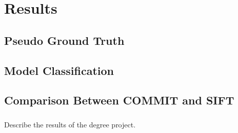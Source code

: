 \chapter{Results}

\section{Pseudo Ground Truth}

\section{Model Classification}

\section{Comparison Between COMMIT and SIFT}

\subsection{}







Describe the results of the degree project.

